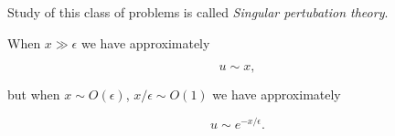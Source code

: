 Study of this class of problems is called \textit{Singular pertubation theory}.

When $x \gg \epsilon$ we have approximately

\begin{equation}\label{eqn:continuumL19:690}
u \sim x,
\end{equation}

but when $x \sim O(\epsilon)$, $x/\epsilon \sim O(1)$ we have approximately

\begin{equation}\label{eqn:continuumL19:710}
u \sim e^{-x/\epsilon}.
\end{equation}

\EndArticle
